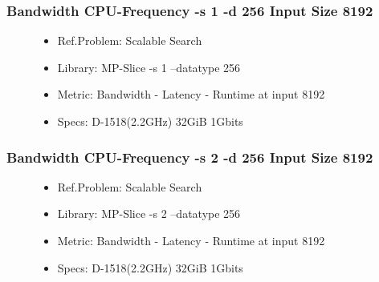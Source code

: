 \begin{frame}
    \frametitle{Bandwidth CPU-Frequency -s 1 -d 256 Input Size 8192}

    \begin{figure}
        \begin{itemize}
            \item Ref.Problem: Scalable Search
            \item Library: MP-Slice -s 1 --datatype 256
            \item Metric: Bandwidth - Latency - Runtime at input 8192
            \item Specs: D-1518(2.2GHz) 32GiB 1Gbits
        \end{itemize}
    \end{figure}

\end{frame}

\begin{frame}
    \frametitle{Bandwidth CPU-Frequency -s 2 -d 256 Input Size 8192}

    \begin{figure}
        \begin{itemize}
            \item Ref.Problem: Scalable Search
            \item Library: MP-Slice -s 2 --datatype 256
            \item Metric: Bandwidth - Latency - Runtime at input 8192
            \item Specs: D-1518(2.2GHz) 32GiB 1Gbits
        \end{itemize}
    \end{figure}

\end{frame}

